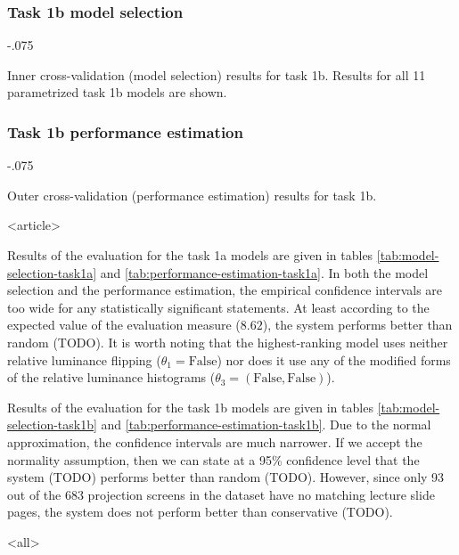 \begin{frame}[fragile]
\frametitle<presentation>{Task 1b model selection}
\begin{table}
\ifarticle
  \leavevmode\kern-.075\textwidth
\fi

\caption{Inner cross-validation (model selection) results for task 1b. Results
  for all 11 parametrized task 1b models are shown.}
\label{tab:model-selection-task1b}
\end{table}
\end{frame}

\begin{frame}[fragile]
\frametitle<presentation>{Task 1b performance estimation}
\begin{table}
\ifarticle
  \leavevmode\kern-.075\textwidth
\fi

\caption{Outer cross-validation (performance estimation) results for task 1b.}
\label{tab:performance-estimation-task1b}
\end{table}
\end{frame}

\mode
<article>

Results of the evaluation for the task 1a models are given in tables
\ref{tab:model-selection-task1a} and \ref{tab:performance-estimation-task1a}.
In both the model selection and the performance estimation, the empirical
confidence intervals are too wide for any statistically significant statements.
At least according to the expected value of the evaluation measure ($8.62$),
the system performs better than random (TODO).
It is worth noting that the highest-ranking model uses neither relative
luminance flipping ($\theta_1=\text{False}$) nor does it use any of the
modified forms of the relative luminance histograms ($\theta_3=(\text{False},
\text{False})$).

Results of the evaluation for the task 1b models are given in tables
\ref{tab:model-selection-task1b} and \ref{tab:performance-estimation-task1b}.
Due to the normal approximation, the confidence intervals are much narrower. If
we accept the normality assumption, then we can state at a 95\% confidence
level that the system (TODO) performs better than random (TODO). However, since
only 93 out of the 683 projection screens in the dataset have no matching
lecture slide pages, the system does not perform better than conservative
(TODO).

\mode
<all>

